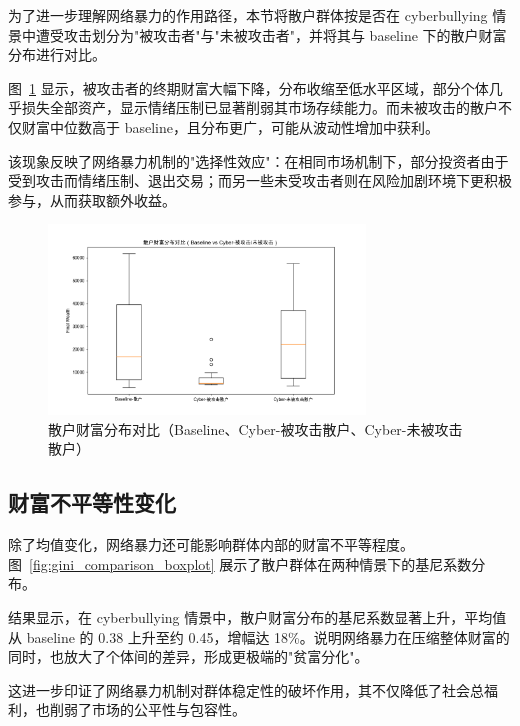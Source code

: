 为了进一步理解网络暴力的作用路径，本节将散户群体按是否在 cyberbullying 情景中遭受攻击划分为"被攻击者"与"未被攻击者"，并将其与 baseline 下的散户财富分布进行对比。

图~\ref{fig:attacked_vs_not_boxplot} 显示，被攻击者的终期财富大幅下降，分布收缩至低水平区域，部分个体几乎损失全部资产，显示情绪压制已显著削弱其市场存续能力。而未被攻击的散户不仅财富中位数高于 baseline，且分布更广，可能从波动性增加中获利。

该现象反映了网络暴力机制的"选择性效应"：在相同市场机制下，部分投资者由于受到攻击而情绪压制、退出交易；而另一些未受攻击者则在风险加剧环境下更积极参与，从而获取额外收益。

\begin{figure}[htbp]
    \centering
    \includegraphics[width=0.75\textwidth]{image/fig4_6_attacked_vs_not_boxplot.png}
    \caption{散户财富分布对比（Baseline、Cyber-被攻击散户、Cyber-未被攻击散户）}
    \label{fig:attacked_vs_not_boxplot}
\end{figure}

\subsection{财富不平等性变化}

除了均值变化，网络暴力还可能影响群体内部的财富不平等程度。图~\ref{fig:gini_comparison_boxplot} 展示了散户群体在两种情景下的基尼系数分布。

结果显示，在 cyberbullying 情景中，散户财富分布的基尼系数显著上升，平均值从 baseline 的 0.38 上升至约 0.45，增幅达 18\%。说明网络暴力在压缩整体财富的同时，也放大了个体间的差异，形成更极端的"贫富分化"。

这进一步印证了网络暴力机制对群体稳定性的破坏作用，其不仅降低了社会总福利，也削弱了市场的公平性与包容性。

